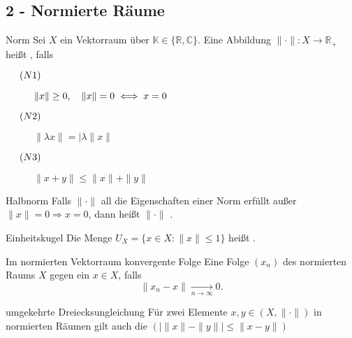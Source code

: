 \subsection*{2 - Normierte Räume}

	\begin{karte}{Norm}
	Sei $X$ ein Vektorraum über $\mathbb{K} \in \{ \mathbb{R}, \mathbb{C} \}$. Eine Abbildung  $\| \cdot \| \colon X \rightarrow \mathbb{R}_{+}$ hei{\ss}t , falls
		\begin{description}
			\item[$\hspace{0.5cm} (N1) \hspace{0.1cm} $] $\| x \| \geq 0, \quad \| x \| = 0 \iff x = 0 $
			\item[$\hspace{0.5cm} (N2) \hspace{0.1cm} $] $\| \lambda x \| = | \lambda \| x \| $
			\item[$\hspace{0.5cm} (N3) \hspace{0.1cm} $] $\| x + y \| \leq \| x \| + \| y \| $
		\end{description}
	\end{karte}
	
	\begin{karte}{Halbnorm}
		Falls $ \| \cdot \| $ all die Eigenschaften einer Norm erfüllt au{\ss}er $ \| x \| = 0 \Rightarrow x = 0 $, dann hei{\ss}t $ \| \cdot \| $ .
	\end{karte}
	
	\begin{karte}{Einheitskugel}
		Die Menge $ U_{X} = \{ x \in X:  \|x \| \leq 1 \}$ hei{\ss}t .
	\end{karte}
	
	\begin{karte}{Im normierten Vektorraum konvergente Folge}
		Eine Folge $(x_{n})$ des normierten Raums $X$  gegen ein $ x \in X $, falls 
		\[ \| x_{n} - x \| \xrightarrow[n \rightarrow \infty]{} 0. \]
	\end{karte}
	
	\begin{karte}{umgekehrte Dreiecksungleichung}
		Für zwei Elemente $x, y \in (X, \| \cdot \|)$ in normierten Räumen gilt auch die  $( \left| \| x \| - \| y \| \right| \leq \| x - y \|)$
	\end{karte}
	
